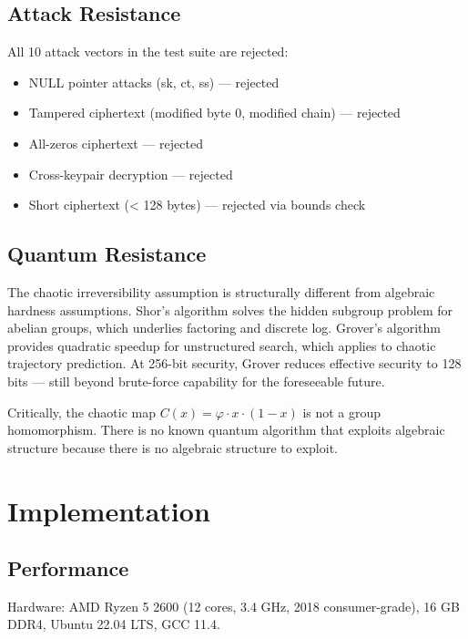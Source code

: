 \documentclass{article}
\begin{document}
\subsection{Attack Resistance}

All 10 attack vectors in the test suite are rejected:
\begin{itemize}
    \item NULL pointer attacks (sk, ct, ss) — rejected
    \item Tampered ciphertext (modified byte 0, modified chain) — rejected
    \item All-zeros ciphertext — rejected
    \item Cross-keypair decryption — rejected
    \item Short ciphertext (< 128 bytes) — rejected via bounds check
\end{itemize}

\subsection{Quantum Resistance}

The chaotic irreversibility assumption is structurally different from algebraic hardness assumptions. Shor's algorithm solves the hidden subgroup problem for abelian groups, which underlies factoring and discrete log. Grover's algorithm provides quadratic speedup for unstructured search, which applies to chaotic trajectory prediction. At 256-bit security, Grover reduces effective security to 128 bits — still beyond brute-force capability for the foreseeable future.

Critically, the chaotic map $C(x) = \varphi \cdot x \cdot (1-x)$ is not a group homomorphism. There is no known quantum algorithm that exploits algebraic structure because there is no algebraic structure to exploit.

\section{Implementation}

\subsection{Performance}

Hardware: AMD Ryzen 5 2600 (12 cores, 3.4 GHz, 2018 consumer-grade), 16 GB DDR4, Ubuntu 22.04 LTS, GCC 11.4.
\end{document}
